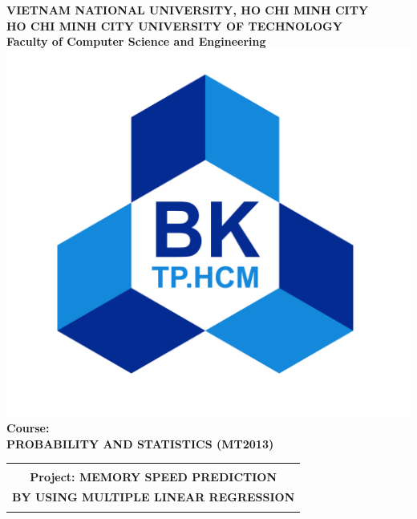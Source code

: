\documentclass[a4paper,12pt]{article}
\begin{document}
\begin{titlepage}
\begin{center}
    \textbf{VIETNAM NATIONAL UNIVERSITY, HO CHI MINH CITY}\\
    \textbf{HO CHI MINH CITY UNIVERSITY OF TECHNOLOGY}\\
    \textbf{Faculty of Computer Science and Engineering}\\

    \vspace{0.5 cm}
    \includegraphics[scale = 0.3]{Logo.png}\\
    \vspace{0.5 cm}
    \large\textbf{Course:}\\
    \large\textbf{PROBABILITY AND STATISTICS (MT2013)}\\
    \vspace{0.5 cm}
    \begin{tabular}{c}
         \hline\\ \textbf{Project: MEMORY SPEED PREDICTION} \\
         \textbf{BY USING MULTIPLE LINEAR REGRESSION}\\ \\ \hline
    \end{tabular}

\end{center}





\end{titlepage}
\end{document}
